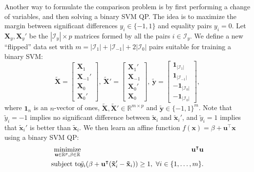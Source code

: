 \documentclass[twoside,11pt]{article}
\newcommand{\RR}{\mathbb R}
\DeclareMathOperator*{\minimize}{minimize}
\begin{document}
Another way to formulate the comparison problem is by first performing
a change of variables, and then solving a binary SVM QP. The idea is
to maximize the margin between significant differences
$y_i\in\{-1,1\}$ and equality pairs $y_i=0$. Let $\mathbf X_y,\mathbf
X_y'$ be the $|\mathcal I_y|\times p$ matrices formed by all the pairs
$i\in \mathcal I_y$. We define a new ``flipped'' data set with
$m=|\mathcal I_1|+|\mathcal I_{-1}|+2|\mathcal I_0|$ pairs suitable
for training a binary SVM:
\begin{equation}
\label{eq:tilde}
\mathbf{  \tilde X} = \left[
    \begin{array}{c}
      \mathbf X_1 \\
      \mathbf X_{-1}'\\
      \mathbf X_0\\
      \mathbf X_0'
    \end{array}
  \right],\ 
  \mathbf{\tilde X'} = \left[
    \begin{array}{c}
      \mathbf X_1' \\
      \mathbf X_{-1}\\
      \mathbf X_0'\\
      \mathbf X_0
    \end{array}
  \right],\ 
  \mathbf{\tilde y} = \left[
    \begin{array}{c}
      \mathbf 1_{|\mathcal I_1|} \\
      \mathbf 1_{|\mathcal I_{-1}|}\\
      \mathbf{-1}_{|\mathcal I_0|}\\
      \mathbf{-1}_{|\mathcal I_0|}
    \end{array}
  \right],
\end{equation}
where $\mathbf 1_n$ is an $n$-vector of ones, $\mathbf{\tilde
  X},\mathbf{\tilde X'}\in\RR^{m\times p}$ and $\mathbf{\tilde
  y}\in\{-1,1\}^m$. Note that $\tilde y_i=-1$ implies no significant
difference between $\mathbf{\tilde x}_i$ and $\mathbf{\tilde x}_i'$,
and $\tilde y_i=1$ implies that $\mathbf{\tilde x}_i'$ is better than
$\mathbf{\tilde x}_i$. We then learn an affine function $f(\mathbf
x)=\beta+\mathbf u^\intercal \mathbf x$ using a binary SVM QP:
\begin{eqnarray}
  \label{eq:max-margin-qp-tilde}
  \minimize_{\mathbf u\in\RR^p, \beta\in\RR}\ &&\hskip -0.5cm
  \mathbf u^\intercal \mathbf u  \\
\nonumber    \text{subject to}\ &&\hskip -0.5cm 
    \tilde y_i (\beta + 
    \mathbf u^\intercal( \mathbf{\tilde x}_i'-\mathbf{\tilde x}_i) ) \geq 1,
    \ \forall i\in\{1,\dots,m\}.
\end{eqnarray}
\end{document}
